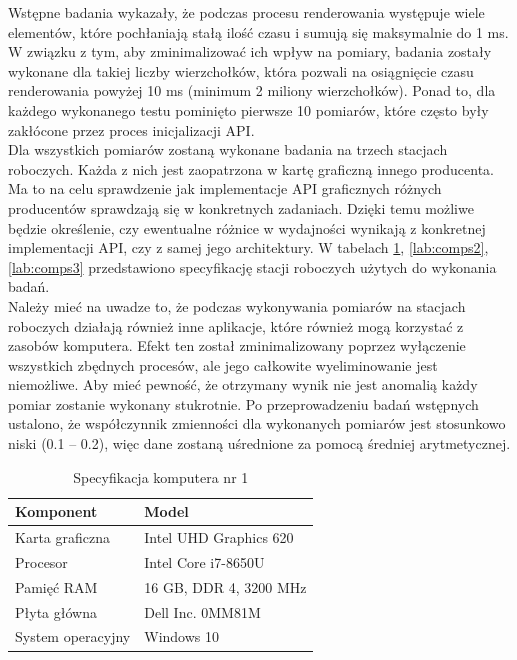 \documentclass[archive]{mgr}
\begin{document}
Wstępne badania wykazały, że podczas procesu renderowania występuje wiele elementów, które pochłaniają stałą ilość czasu i sumują się maksymalnie do 1 ms. W związku z tym, aby zminimalizować ich wpływ na pomiary, badania zostały wykonane dla takiej liczby wierzchołków, która pozwali na osiągnięcie czasu renderowania powyżej 10 ms (minimum 2 miliony wierzchołków). Ponad to, dla każdego wykonanego testu pominięto pierwsze 10 pomiarów, które często były zakłócone przez proces inicjalizacji API.\\

Dla wszystkich pomiarów zostaną wykonane badania na trzech stacjach roboczych. Każda z nich jest zaopatrzona w kartę graficzną innego producenta. Ma to na celu sprawdzenie jak implementacje API graficznych różnych producentów sprawdzają się w konkretnych zadaniach. Dzięki temu możliwe będzie określenie, czy ewentualne różnice w wydajności wynikają z konkretnej implementacji API, czy z samej jego architektury. W tabelach \ref{lab:comps1}, \ref{lab:comps2}, \ref{lab:comps3} przedstawiono specyfikację stacji roboczych użytych do wykonania badań.\\

Należy mieć na uwadze to, że podczas wykonywania pomiarów na stacjach roboczych działają również inne aplikacje, które również mogą korzystać z zasobów komputera. Efekt ten został zminimalizowany poprzez wyłączenie wszystkich zbędnych procesów, ale jego całkowite wyeliminowanie jest niemożliwe. Aby mieć pewność, że otrzymany wynik nie jest anomalią każdy pomiar zostanie wykonany stukrotnie. Po przeprowadzeniu badań wstępnych ustalono, że współczynnik zmienności dla wykonanych pomiarów jest stosunkowo niski (0.1 – 0.2), więc dane zostaną uśrednione za pomocą średniej arytmetycznej.

\begin{table}[!h]

    \centering 
    \caption{Specyfikacja komputera nr 1}
    		\label{lab:comps1}
    \vspace{2mm} 
\begin{tabular}{|l|l|}
\hline

\textbf{Komponent}&	\textbf{Model}\\ \hline
Karta graficzna & Intel UHD Graphics 620  \\ \hline
Procesor & Intel Core i7-8650U  \\ \hline
Pamięć RAM & 16 GB, DDR 4, 3200 MHz \\ \hline
Płyta główna & Dell Inc. 0MM81M \\ \hline
System operacyjny & Windows 10 \\ \hline
\end{tabular}
\end{table}
\end{document}
